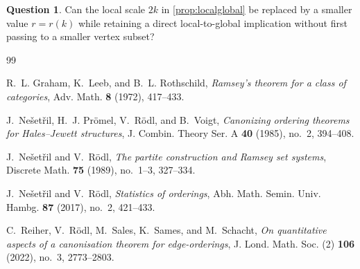 \documentclass[11pt]{amsart}
\theoremstyle{definition}
\newtheorem{question}[theorem]{Question}
\begin{document}
\begin{question}
Can the local scale $2k$ in \cref{prop:localglobal} be replaced by a smaller value $r=r(k)$ while retaining a direct local-to-global implication without first passing to a smaller vertex subset?
\end{question}

\begin{thebibliography}{99}

R.~L. Graham, K.~Leeb, and B.~L. Rothschild,
\emph{Ramsey's theorem for a class of categories},
Adv. Math. \textbf{8} (1972), 417--433.

J.~Ne\v{s}et\v{r}il, H.~J. Pr\"omel, V.~R\"odl, and B.~Voigt,
\emph{Canonizing ordering theorems for Hales--Jewett structures},
J. Combin. Theory Ser. A \textbf{40} (1985), no.~2, 394--408.

J.~Ne\v{s}et\v{r}il and V.~R\"odl,
\emph{The partite construction and Ramsey set systems},
Discrete Math. \textbf{75} (1989), no.~1--3, 327--334.

J.~Ne\v{s}et\v{r}il and V.~R\"odl,
\emph{Statistics of orderings},
Abh. Math. Semin. Univ. Hambg. \textbf{87} (2017), no.~2, 421--433.

C.~Reiher, V.~R\"odl, M.~Sales, K.~Sames, and M.~Schacht,
\emph{On quantitative aspects of a canonisation theorem for edge-orderings},
J. Lond. Math. Soc. (2) \textbf{106} (2022), no.~3, 2773--2803.

\end{thebibliography}
\end{document}
